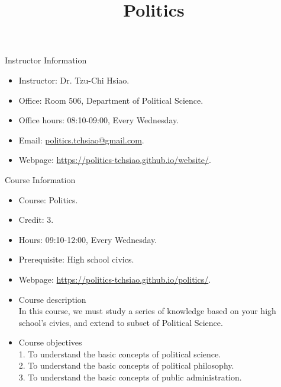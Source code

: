 \documentclass{article}
\title{\fontsize{16pt}{16pt}\selectfont Politics}
\author{}
\date{}
\begin{document}
\maketitle
\fontsize{14pt}{14pt}\selectfont
\begin{flushleft}
Instructor Information
\end{flushleft}
\begin{itemize}
\item Instructor: Dr. Tzu-Chi Hsiao. \\
\item Office: Room 506, Department of Political Science. \\
\item Office hours: 08:10-09:00, Every Wednesday. \\
\item Email: \href{mailto:politics.tchsiao@gmail.com}{politics.tchsiao@gmail.com}. \\
\item Webpage: \href{https://politics-tchsiao.github.io/website/}{https://politics-tchsiao.github.io/website/}. \\
\end{itemize}
Course Information \\
\begin{itemize}
\item Course: Politics. \\
\item Credit: 3. \\
\item Hours: 09:10-12:00, Every Wednesday. \\
\item Prerequisite: High school civics. \\
\item Webpage: \href{https://politics-tchsiao.github.io/politics/}{https://politics-tchsiao.github.io/politics/}. \\
\item Course description \\
In this course, we must study a series of knowledge based on your high school's civics, and extend to subset of Political Science. \\ 
\item Course objectives \\
1. To understand the basic concepts of political science. \\
2. To understand the basic concepts of political philosophy. \\
3. To understand the basic concepts of public administration. \\
\end{itemize}
\end{document}
